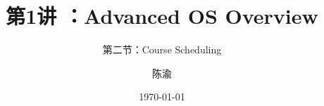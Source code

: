 


\title[第1讲]{第1讲 ：Advanced OS Overview} %
\subtitle{第二节：Course Scheduling}
\author{陈渝} %
\date{\today} %




\begin{frame}
\titlepage %
\end{frame}


